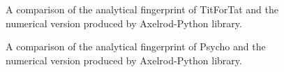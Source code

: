 \begin{figure}[htbp!]
\caption{A comparison of the analytical fingerprint of TitForTat and the numerical version produced by Axelrod-Python library.}
\label{fig:TFT-comparison}
\end{figure}
\begin{figure}[htbp!]
\caption{A comparison of the analytical fingerprint of Psycho and the numerical version produced by Axelrod-Python library.}
\label{fig:Psycho-comparison}
\end{figure}
